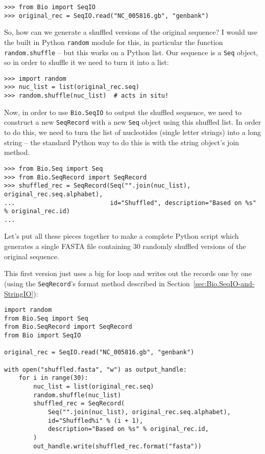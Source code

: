\begin{verbatim}
>>> from Bio import SeqIO
>>> original_rec = SeqIO.read("NC_005816.gb", "genbank")
\end{verbatim}

So, how can we generate a shuffled versions of the original sequence?  I would
use the built in Python \verb|random| module for this, in particular the function
\verb|random.shuffle| -- but this works on a Python list.  Our sequence is a
\verb|Seq| object, so in order to shuffle it we need to turn it into a list:

\begin{verbatim}
>>> import random
>>> nuc_list = list(original_rec.seq)
>>> random.shuffle(nuc_list)  # acts in situ!
\end{verbatim}

Now, in order to use \verb|Bio.SeqIO| to output the shuffled sequence, we need
to construct a new \verb|SeqRecord| with a new \verb|Seq| object using this
shuffled list.  In order to do this, we need to turn the list of nucleotides
(single letter strings) into a long string -- the standard Python way to do
this is with the string object's join method.

\begin{verbatim}
>>> from Bio.Seq import Seq
>>> from Bio.SeqRecord import SeqRecord
>>> shuffled_rec = SeqRecord(Seq("".join(nuc_list), original_rec.seq.alphabet),
...                          id="Shuffled", description="Based on %s" % original_rec.id)
...
\end{verbatim}

Let's put all these pieces together to make a complete Python script which
generates a single FASTA file containing 30 randomly shuffled versions of
the original sequence.

This first version just uses a big for loop and writes out the records one by one
(using the \verb|SeqRecord|'s format method described in
Section~\ref{sec:Bio.SeqIO-and-StringIO}):

\begin{verbatim}
import random
from Bio.Seq import Seq
from Bio.SeqRecord import SeqRecord
from Bio import SeqIO

original_rec = SeqIO.read("NC_005816.gb", "genbank")

with open("shuffled.fasta", "w") as output_handle:
    for i in range(30):
        nuc_list = list(original_rec.seq)
        random.shuffle(nuc_list)
        shuffled_rec = SeqRecord(
            Seq("".join(nuc_list), original_rec.seq.alphabet),
            id="Shuffled%i" % (i + 1),
            description="Based on %s" % original_rec.id,
        )
        out_handle.write(shuffled_rec.format("fasta"))
\end{verbatim}

